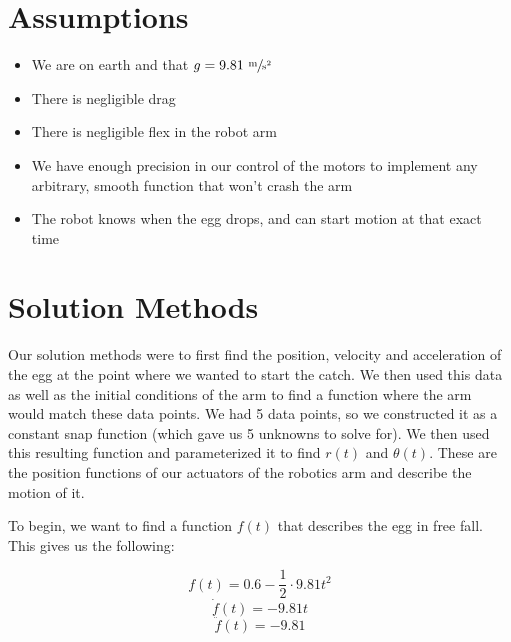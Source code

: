 \documentclass[nofoot,pdf-a,balance,colorlinks,upint,subscriptcorrection,varvw,mathalfa=cal=boondoxo]{asmeconf}
\begin{document}
		\section*{Assumptions}
	
	\begin{itemize}
        \item We are on earth and that $g = 9.81 \textrm{ }\sfrac{\textrm{m}}{\textrm{s}^2}$
		\item There is negligible drag
		\item There is negligible flex in the robot arm
        \item We have enough precision in our control of the motors to implement any arbitrary, smooth function that won't crash the arm
		\item The robot knows when the egg drops, and can start motion at that exact time
	\end{itemize}

	\section*{Solution Methods}
	
		Our solution methods were to first find the position, velocity and acceleration of the egg at the point where we wanted to start the catch. We then used this data as well as the initial conditions of the arm to find a function where the arm would match these data points. We had 5 data points, so we constructed it as a constant snap function (which gave us 5 unknowns to solve for). We then used this resulting function and parameterized it to find $r\left(t\right)$ and $\theta\left(t\right)$. These are the position functions of our actuators of the robotics arm and describe the motion of it.\newline

        To begin, we want to find a function $f\left(t\right)$ that describes the egg in free fall. This gives us the following:

        \begin{equation}\label{f_t}
            f\left(t\right) = 0.6 - \frac{1}{2} \cdot 9.81 t^2
        \end{equation}
        \begin{equation}
            \dot{f}\left(t\right) = - 9.81 t
        \end{equation}
        \begin{equation}
            \ddot{f}\left(t\right) = - 9.81
        \end{equation}
\end{document}
